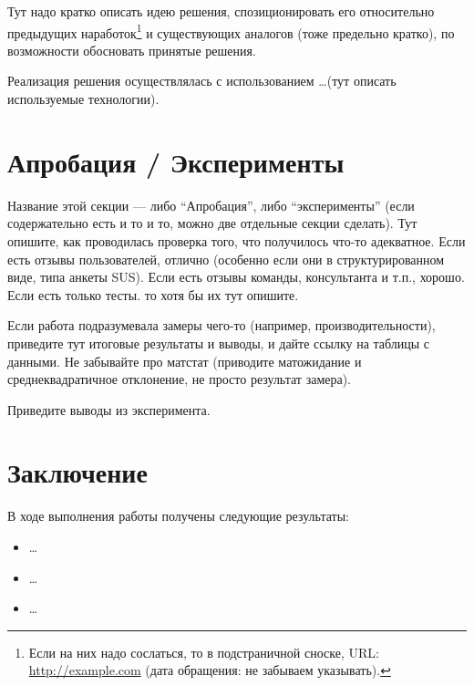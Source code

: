 \documentclass[a4paper]{article}
\begin{document}

Тут надо кратко описать идею решения, спозиционировать его относительно предыдущих наработок\footnote{Если на них надо сослаться, то в подстраничной сноске, URL: \url{http://example.com} (дата обращения: не забываем указывать).} и существующих аналогов (тоже предельно кратко), по возможности обосновать принятые решения.

Реализация решения осуществлялась с использованием \dots (тут описать используемые технологии).

\section{Апробация / Эксперименты}


Название этой секции --- либо \enquote{Апробация}, либо \enquote{эксперименты} (если содержательно есть и то и то, можно две отдельные секции сделать). Тут опишите, как проводилась проверка того, что получилось что-то адекватное. Если есть отзывы пользователей, отлично (особенно если они в структурированном виде, типа анкеты SUS). Если есть отзывы команды, консультанта и т.п., хорошо. Если есть только тесты. то хотя бы их тут опишите.

Если работа подразумевала замеры чего-то (например, производительности), приведите тут итоговые результаты и выводы, и дайте ссылку на таблицы с данными. Не забывайте про матстат (приводите матожидание и среднеквадратичное отклонение, не просто результат замера).

Приведите выводы из эксперимента.

\section{Заключение}

В ходе выполнения работы получены следующие результаты:


\begin{itemize}
    \item \dots
    \item \dots
    \item \dots
\end{itemize}
\end{document}
